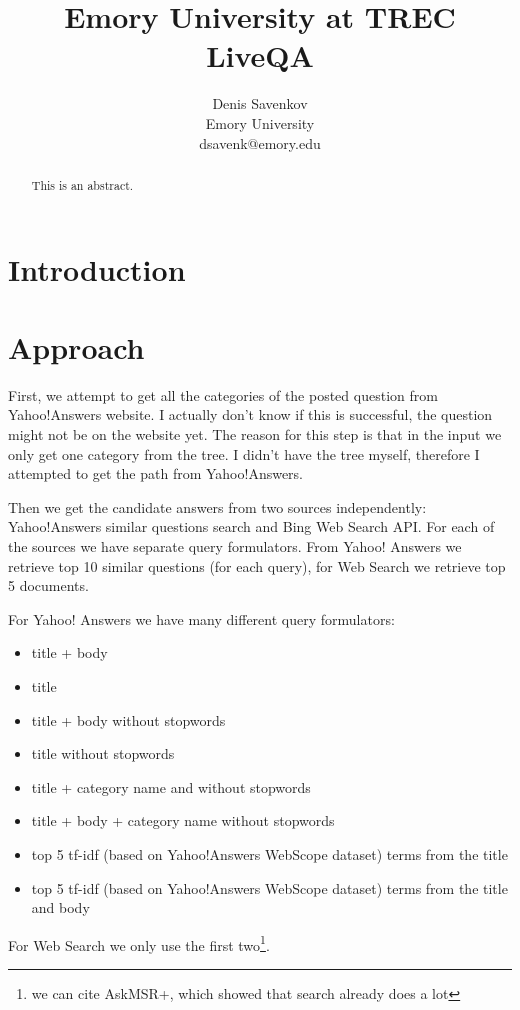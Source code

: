 \documentclass[]{article}
\title{Emory University at TREC LiveQA}
\author{Denis Savenkov\\Emory University\\dsavenk@emory.edu}
\begin{document}
\maketitle

\begin{abstract}
This is an abstract.
\end{abstract}

\section{Introduction}

\section{Approach}
First, we attempt to get all the categories of the posted question from Yahoo!Answers website. I actually don't know if this is successful, the question might not be on the website yet. The reason for this step is that in the input we only get one category from the tree. I didn't have the tree myself, therefore I attempted to get the path from Yahoo!Answers.

Then we get the candidate answers from two sources independently: Yahoo!Answers similar questions search and Bing Web Search API.
For each of the sources we have separate query formulators.
From Yahoo! Answers we retrieve top 10 similar questions (for each query), for Web Search we retrieve top 5 documents.

For Yahoo! Answers we have many different query formulators:
\begin{itemize}
\item title + body
\item title
\item title + body without stopwords
\item title without stopwords
\item title + category name and without stopwords
\item title + body + category name without stopwords
\item top 5 tf-idf (based on Yahoo!Answers WebScope dataset) terms from the title
\item top 5 tf-idf (based on Yahoo!Answers WebScope dataset) terms from the title and body
\end{itemize}

For Web Search we only use the first two\footnote{we can cite AskMSR+, which showed that search already does a lot}.
\end{document}

